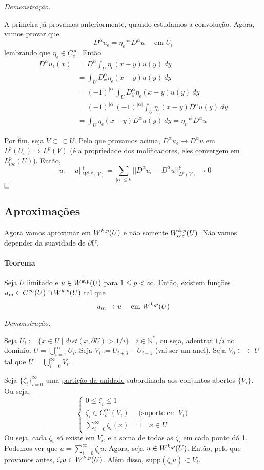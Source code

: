 \documentclass[a4paper, 11pt]{article}
\newcommand{\qed}{$\hfill\square$}
\newcommand{\N}{\mathbb{N}}
\newcommand{\pu}{\partial U}
\newcommand{\e}{\epsilon}
\begin{document}
\textit{Demonstração.}

A primeira já provamos anteriormente, quando estudamos a convolução. Agora, vamos provar que \[ D^\alpha u_\e = \eta_\e * D^\alpha u \quad \text{ em } U_\e\] lembrando que \( \eta_\e \in C^\infty_c \). Então \begin{align*}
	D^\alpha u_\e(x) &= D^\alpha \int_U \eta_\e(x-y) u(y)\ dy\\
	&=  \int_U D^\alpha_x \eta_\e(x-y) u(y)\ dy\\
	&=  (-1)^{|\alpha|} \int_U D^\alpha_y \eta_\e(x-y) u(y)\ dy\\
	&= (-1)^{|\alpha|}(-1)^{|\alpha|}  \int_U \eta_\e(x-y) D^\alpha u(y)\ dy\\
	&=  \int_U \eta_\e(x-y) D^\alpha u(y)\ dy = \eta_\e * D^\alpha u
\end{align*}

Por fim, seja \( V \subset\subset U \). Pelo que provamos acima, \( D^\alpha u_\e \rightarrow D^\alpha u \) em \( L^p(U_\e) \Rightarrow L^p(V) \) (é a propriedade dos molificadores, eles convergem em \( L^p_{loc}(U) \)). Então, \[ ||u_\e - u||^p_{W^{k,p}(V)} = \sum_{|\alpha|\leq k} ||D^\alpha u_\e - D^\alpha u||^p_{L^p(V)} \rightarrow 0\] \qed

\subsection{Aproximações}

Agora vamos aproximar em \( W^{k,p}(U) \) e não somente \( W^{k,p}_{loc}(U)\). Não vamos depender da suavidade de \( \pu \).

\paragraph{Teorema} Seja \( U \) limitado e \( u \in W^{k,p}(U) \) para \( 1\leq p < \infty \). Então, existem funções \( u_m \in C^{\infty}(U) \cap W^{k,p}(U) \) tal que \[ u_m \rightarrow u \quad \text{ em }W^{k,p}(U) \]

\textit{Demonstração.}

Seja \( U_i := \{ x \in U \mid dist(x, \pu) > 1/i\} \quad i \in \N^*\), ou seja, adentrar \( 1/i \) no domínio. \( U = \bigcup_{i=1}^\infty U_i \). Seja \( V_i := U_{i+3} - \overline{U}_{i+1} \) (vai ser um anel). Seja \( V_0 \subset\subset U \) tal que \( U=\bigcup_{i=0}^{\infty}V_i \).

Seja \( \{\zeta_i\}_{i=0}^{\infty} \) uma \href{https://en.wikipedia.org/wiki/Partition_of_unity}{partição da unidade} subordinada aos conjuntos abertos \( \{V_i\} \). Ou seja, \[ \begin{cases}
	0 \leq \zeta_i \leq 1 \\
	\zeta_i \in C^\infty_c(V_i)\quad  \text{ (suporte em } V_i \text{)}\\
	\sum_{i=0}^{\infty} \zeta_i(x) = 1 \quad x \in U
\end{cases} \] Ou seja, cada \( \zeta_i \) só existe em \( V_i \), e a soma de todas as \( \zeta_i \) em cada ponto dá 1. Podemos ver que \( u=\sum_{i=0}^{\infty}\zeta_iu \). Agora, seja \( u \in W^{k,p}(U) \). Então, pelo que provamos antes, \( \zeta_iu \in W^{k,p}(U) \). Além disso, \( \text{supp}(\zeta_i u) \subset V_i \).
\end{document}
